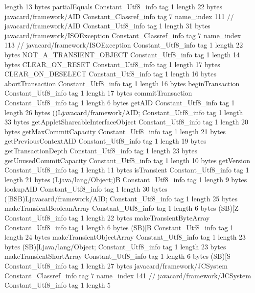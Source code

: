 {{{			length	13
			bytes	partialEquals
		}
		Constant_Utf8_info {
			tag	1
			length	22
			bytes	javacard/framework/AID
		}
		Constant_Classref_info {
			tag	7
			name_index	111		// javacard/framework/AID
		}
		Constant_Utf8_info {
			tag	1
			length	31
			bytes	javacard/framework/ISOException
		}
		Constant_Classref_info {
			tag	7
			name_index	113		// javacard/framework/ISOException
		}
		Constant_Utf8_info {
			tag	1
			length	22
			bytes	NOT_A_TRANSIENT_OBJECT
		}
		Constant_Utf8_info {
			tag	1
			length	14
			bytes	CLEAR_ON_RESET
		}
		Constant_Utf8_info {
			tag	1
			length	17
			bytes	CLEAR_ON_DESELECT
		}
		Constant_Utf8_info {
			tag	1
			length	16
			bytes	abortTransaction
		}
		Constant_Utf8_info {
			tag	1
			length	16
			bytes	beginTransaction
		}
		Constant_Utf8_info {
			tag	1
			length	17
			bytes	commitTransaction
		}
		Constant_Utf8_info {
			tag	1
			length	6
			bytes	getAID
		}
		Constant_Utf8_info {
			tag	1
			length	26
			bytes	()Ljavacard/framework/AID;
		}
		Constant_Utf8_info {
			tag	1
			length	33
			bytes	getAppletShareableInterfaceObject
		}
		Constant_Utf8_info {
			tag	1
			length	20
			bytes	getMaxCommitCapacity
		}
		Constant_Utf8_info {
			tag	1
			length	21
			bytes	getPreviousContextAID
		}
		Constant_Utf8_info {
			tag	1
			length	19
			bytes	getTransactionDepth
		}
		Constant_Utf8_info {
			tag	1
			length	23
			bytes	getUnusedCommitCapacity
		}
		Constant_Utf8_info {
			tag	1
			length	10
			bytes	getVersion
		}
		Constant_Utf8_info {
			tag	1
			length	11
			bytes	isTransient
		}
		Constant_Utf8_info {
			tag	1
			length	21
			bytes	(Ljava/lang/Object;)B
		}
		Constant_Utf8_info {
			tag	1
			length	9
			bytes	lookupAID
		}
		Constant_Utf8_info {
			tag	1
			length	30
			bytes	([BSB)Ljavacard/framework/AID;
		}
		Constant_Utf8_info {
			tag	1
			length	25
			bytes	makeTransientBooleanArray
		}
		Constant_Utf8_info {
			tag	1
			length	6
			bytes	(SB)[Z
		}
		Constant_Utf8_info {
			tag	1
			length	22
			bytes	makeTransientByteArray
		}
		Constant_Utf8_info {
			tag	1
			length	6
			bytes	(SB)[B
		}
		Constant_Utf8_info {
			tag	1
			length	24
			bytes	makeTransientObjectArray
		}
		Constant_Utf8_info {
			tag	1
			length	23
			bytes	(SB)[Ljava/lang/Object;
		}
		Constant_Utf8_info {
			tag	1
			length	23
			bytes	makeTransientShortArray
		}
		Constant_Utf8_info {
			tag	1
			length	6
			bytes	(SB)[S
		}
		Constant_Utf8_info {
			tag	1
			length	27
			bytes	javacard/framework/JCSystem
		}
		Constant_Classref_info {
			tag	7
			name_index	141		// javacard/framework/JCSystem
		}
		Constant_Utf8_info {
			tag	1
			length	5
}}}
